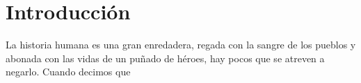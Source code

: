\chapter{Introducción}

La historia humana es una gran enredadera, regada con la sangre de los pueblos y abonada con las vidas de un puñado de héroes, hay pocos que se atreven a negarlo. Cuando decimos que  